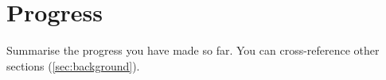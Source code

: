 \section{Progress}
\label{sec:progress}

Summarise the progress you have made so far. You can cross-reference other sections (\ref{sec:background}).